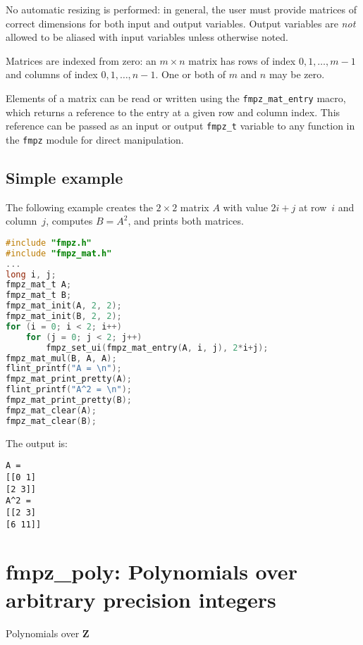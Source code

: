 \documentclass[a4paper,10pt]{book}
\newcommand{\Z}{\mathbf{Z}}%
\newcommand{\code}{\lstinline}
\begin{document}
{{No automatic resizing is performed: in general, the user must provide
matrices of correct dimensions for both input and output variables. Output
variables are \emph{not} allowed to be aliased with input variables unless
otherwise noted.

Matrices are indexed from zero: an $m \times n$ matrix
has rows of index $0,1,\ldots,m-1$ and columns of
index $0,1,\ldots,n-1$. One or both of $m$ and $n$ may be zero.

Elements of a matrix can be read or written using the \code{fmpz_mat_entry}
macro, which returns a reference to the entry at a given row and column index.
This reference can be passed as an input or output \code{fmpz_t} variable to
any function in the \code{fmpz} module for direct manipulation.

\section{Simple example}
The following example creates the $2 \times 2$ matrix $A$ with
value $2i+j$ at row~$i$ and column~$j$, computes $B = A^2$,
and prints both matrices.

\begin{lstlisting}[language=c]
#include "fmpz.h"
#include "fmpz_mat.h"
...
long i, j;
fmpz_mat_t A;
fmpz_mat_t B;
fmpz_mat_init(A, 2, 2);
fmpz_mat_init(B, 2, 2);
for (i = 0; i < 2; i++)
    for (j = 0; j < 2; j++)
        fmpz_set_ui(fmpz_mat_entry(A, i, j), 2*i+j);
fmpz_mat_mul(B, A, A);
flint_printf("A = \n");
fmpz_mat_print_pretty(A);
flint_printf("A^2 = \n");
fmpz_mat_print_pretty(B);
fmpz_mat_clear(A);
fmpz_mat_clear(B);
\end{lstlisting}

The output is:
\begin{lstlisting}
A =
[[0 1]
[2 3]]
A^2 =
[[2 3]
[6 11]]
\end{lstlisting}





\chapter{fmpz\_poly: Polynomials over arbitrary precision integers}
\epigraph{Polynomials over $\Z$}{}

}}
\end{document}
